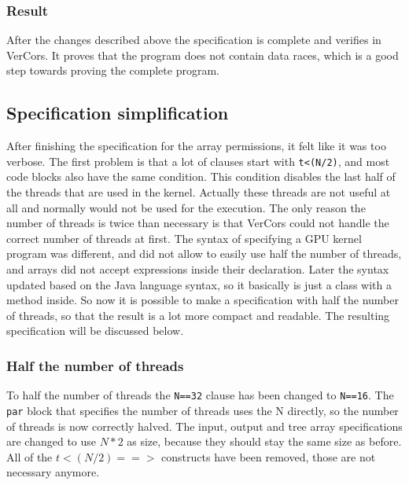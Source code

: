 \documentclass[a4paper]{article}
\newcommand{\code}[1]{\texttt{\small \color{inline}#1}} %
\begin{document}
\subsubsection{Result}
After the changes described above the specification is complete and verifies in VerCors. It proves that the program does not contain data races, which is a good step towards proving the complete program.



\subsection{Specification simplification}
After finishing the specification for the array permissions, it felt like it was too verbose. The first problem is that a lot of clauses start with \code{t<(N/2)}, and most code blocks also have the same condition. This condition disables the last half of the threads that are used in the kernel. Actually these threads are not useful at all and normally would not be used for the execution. The only reason the number of threads is twice than necessary is that VerCors could not handle the correct number of threads at first. The syntax of specifying a GPU kernel program was different, and did not allow to easily use half the number of threads, and arrays did not accept expressions inside their declaration. Later the syntax updated based on the Java language syntax, so it basically is just a class with a method inside. So now it is possible to make a specification with half the number of threads, so that the result is a lot more compact and readable. The resulting specification will be discussed below.

\subsubsection{Half the number of threads}
To half the number of threads the \code{N==32} clause has been changed to \code{N==16}. The \code{par} block that specifies the number of threads uses the N directly, so the number of threads is now correctly halved. The input, output and tree array specifications are changed to use $N*2$ as size, because they should stay the same size as before. All of the $t<(N/2) ==>$ constructs have been removed, those are not necessary anymore.
\end{document}
